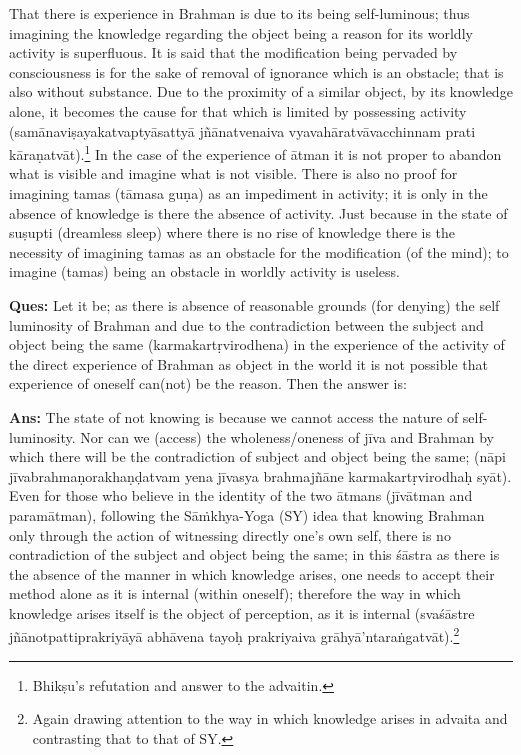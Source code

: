 That there is experience in Brahman is due to its being self-luminous; thus imagining the knowledge regarding the object being a reason for its worldly activity is superfluous. It is said that the modification being pervaded by consciousness   is for the sake of removal of ignorance which is an obstacle; that is also without substance. Due to the proximity of a similar object, by its knowledge alone, it becomes the cause for that which is limited by possessing activity (samānaviṣayakatvaptyāsattyā jñānatvenaiva vyavahāratvāvacchinnam prati kāraṇatvāt).\footnote{Bhikṣu’s refutation and answer to the advaitin.} In the case of the experience of ātman it is not proper to abandon what is visible and imagine what is not visible. There is also no proof for imagining tamas (tāmasa guṇa) as an impediment in activity; it is only in the absence of knowledge is there the absence of activity. Just because in the state of suṣupti (dreamless sleep) where there is no rise of knowledge there is the necessity of imagining tamas as an obstacle for the modification (of the mind); to imagine (tamas) being an obstacle in worldly activity is useless.

\textbf{Ques:} Let it be; as there is absence of reasonable grounds (for denying) the self luminosity of Brahman and due to the contradiction between the subject and object being the same (karmakartṛvirodhena) in the experience of the activity of the direct experience of Brahman as object in the world it is not possible that experience of oneself can(not) be the reason. Then the answer is: 

\textbf{Ans:} The state of not knowing is because we cannot access the nature of self-luminosity. Nor can we (access) the wholeness/oneness of jīva and Brahman by which there will be the contradiction of subject and object being the same;  (nāpi jīvabrahmaṇorakhaṇḍatvam yena jīvasya brahmajñāne karmakartṛvirodhaḥ syāt). Even for those who believe in the identity of the two ātmans (jīvātman and paramātman), following the Sāṁkhya-Yoga (SY) idea that  knowing Brahman only through the action of witnessing directly one’s own self, there is no contradiction of the subject and object being the same; in this śāstra as there is the absence of the manner in which knowledge arises, one needs to accept their method alone as it is internal (within oneself); therefore the way in which knowledge arises itself is the object of perception, as it is internal (svaśāstre jñānotpattiprakriyāyā abhāvena tayoḥ prakriyaiva grāhyā’ntaraṅgatvāt).\footnote{Again drawing attention to the way in which knowledge arises in advaita and contrasting that to that of SY.}

